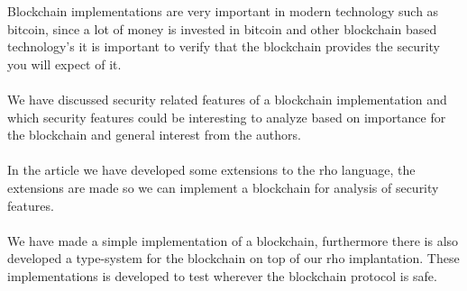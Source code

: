 Blockchain implementations are very important in modern technology such as bitcoin, since a lot of money is invested in bitcoin and other blockchain based technology's it is important to verify that the blockchain provides the security you will expect of it.\\
\\
We have discussed security related features of a blockchain implementation and which security features could be interesting to analyze based on importance for the blockchain and general interest from the authors.\\
\\
In the article we have developed some extensions to the rho language, the extensions are made so we can implement a blockchain for analysis of security features.\\
\\
We have made a simple implementation of a blockchain, furthermore there is also developed a type-system for the blockchain on top of our rho implantation. These implementations is developed to test wherever the blockchain protocol is safe.